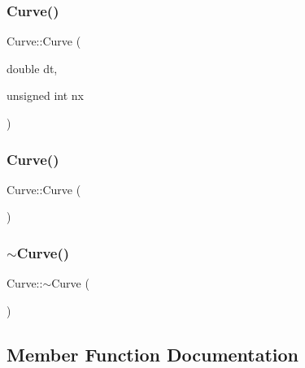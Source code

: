 \mbox{\label{class_curve_a5447f926f128f5eca036a89d1b1d4e3f}} 
\subsubsection{\texorpdfstring{Curve()}{Curve()}\hspace{0.1cm}{\footnotesize\ttfamily [5/6]}}
{\footnotesize\ttfamily Curve\+::\+Curve (\begin{DoxyParamCaption}\item[{double}]{dt,  }\item[{unsigned int}]{nx }\end{DoxyParamCaption})}

\mbox{\label{class_curve_a09c87588b0ceab57603fb6e193875b20}} 
\subsubsection{\texorpdfstring{Curve()}{Curve()}\hspace{0.1cm}{\footnotesize\ttfamily [6/6]}}
{\footnotesize\ttfamily Curve\+::\+Curve (\begin{DoxyParamCaption}{ }\end{DoxyParamCaption})\hspace{0.3cm}{\ttfamily [default]}}

\mbox{\label{class_curve_a7ce6ff79064e9795241423ed47166539}} 
\subsubsection{\texorpdfstring{$\sim$\+Curve()}{~Curve()}}
{\footnotesize\ttfamily Curve\+::$\sim$\+Curve (\begin{DoxyParamCaption}{ }\end{DoxyParamCaption})\hspace{0.3cm}{\ttfamily [inline]}}



\subsection{Member Function Documentation}
\mbox{\label{class_curve_aa4b45f195d903ae171dd7572cc5fb796}} 

